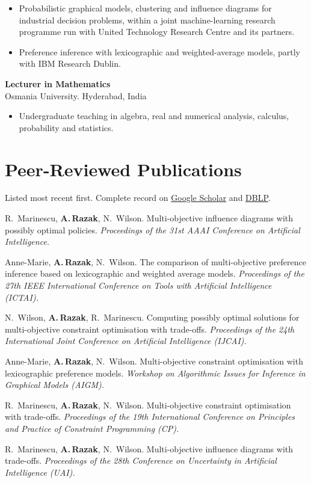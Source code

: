 \documentclass[9pt,letterpaper]{extarticle}
\newlength{\gutter}\setlength{\gutter}{0.78in}
\newenvironment{dated}[1][4pt]
  {\begin{list}{}{%
      \setlength{\labelwidth}{\gutter}
      \setlength{\labelsep}{0.16in}
      \setlength{\leftmargin}{\dimexpr\gutter+0.16in\relax}
      \setlength{\itemsep}{#1}
      \setlength{\parsep}{0pt}
      \setlength{\topsep}{3pt}
      \renewcommand{\makelabel}[1]{\raggedright\small\color{soft}##1\hfill}}}
  {\end{list}}
\newcommand{\role}[2]{{\normalsize\bfseries #1}\\[1.5pt]{\color{accent}#2}}
\newenvironment{duties}
  {\begin{itemize}[leftmargin=11pt, topsep=3pt, itemsep=3.4pt,
                   parsep=0pt, label={\color{accent}\rule[2.2pt]{4pt}{0.6pt}}]}
  {\end{itemize}}
\newenvironment{refs}
  {\begin{list}{}{%
      \setlength{\labelwidth}{0.34in}
      \setlength{\labelsep}{0.16in}
      \setlength{\leftmargin}{0.50in}
      \setlength{\itemsep}{3.2pt}
      \setlength{\parsep}{0pt}
      \setlength{\topsep}{3pt}
      \renewcommand{\makelabel}[1]{\small\color{soft}##1\hfill}}}
  {\end{list}}
\newcommand{\me}{\textbf{A.\,Razak}}
\newcommand{\venue}[1]{\textit{\color{soft}#1}}
\begin{document}
\begin{dated}
    \begin{duties}
      \item Probabilistic graphical models, clustering and influence diagrams for industrial decision problems,
            within a joint machine-learning research programme run with United Technology Research Centre and its partners.
      \item Preference inference with lexicographic and weighted-average models, partly with IBM Research
            Dublin.
    \end{duties}
  \item[2005--2010]
    \role{Lecturer in Mathematics}{Osmania University. Hyderabad, India}
    \begin{duties}
      \item Undergraduate teaching in algebra, real and numerical analysis, calculus, probability and
            statistics.
    \end{duties}
\end{dated}

\clearpage

\section{Peer-Reviewed Publications}
{\small\color{soft}Listed most recent first. Complete record on
 \href{https://scholar.google.com/citations?user=NeuA3uAAAAAJ\&hl=en}{Google Scholar} and
 \href{https://dblp.org/pid/120/1333.html}{DBLP}.}
\begin{refs}
  \item[2017] R.~Marinescu, \me, N.~Wilson. Multi-objective influence diagrams with possibly
        optimal policies. \venue{Proceedings of the 31st AAAI Conference on Artificial
        Intelligence.}
  \item[2015] Anne-Marie, \me, N.~Wilson. The comparison of multi-objective preference inference
        based on lexicographic and weighted average models. \venue{Proceedings of the 27th IEEE
        International Conference on Tools with Artificial Intelligence (ICTAI).}
  \item[2015] N.~Wilson, \me, R.~Marinescu. Computing possibly optimal solutions for
        multi-objective constraint optimisation with trade-offs. \venue{Proceedings of the 24th
        International Joint Conference on Artificial Intelligence (IJCAI).}
  \item[2015] Anne-Marie, \me, N.~Wilson. Multi-objective constraint optimisation with lexicographic
        preference models. \venue{Workshop on Algorithmic Issues for Inference in Graphical Models
        (AIGM).}
  \item[2013] R.~Marinescu, \me, N.~Wilson. Multi-objective constraint optimisation with trade-offs.
        \venue{Proceedings of the 19th International Conference on Principles and Practice of
        Constraint Programming (CP).}
  \item[2012] R.~Marinescu, \me, N.~Wilson. Multi-objective influence diagrams with trade-offs.
        \venue{Proceedings of the 28th Conference on Uncertainty in Artificial Intelligence (UAI).}
\end{refs}
\end{document}
